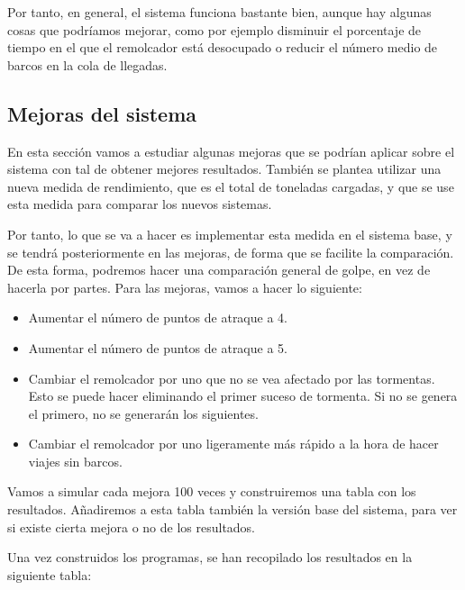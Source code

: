 \documentclass[11pt,a4paper]{article}
\begin{document}
Por tanto, en general, el sistema funciona bastante bien, aunque hay algunas cosas
que podríamos mejorar, como por ejemplo disminuir el porcentaje de tiempo en el que
el remolcador está desocupado o reducir el número medio de barcos en la cola de llegadas.

\subsection{Mejoras del sistema}

En esta sección vamos a estudiar algunas mejoras que se podrían aplicar sobre el
sistema con tal de obtener mejores resultados. También se plantea utilizar una nueva
medida de rendimiento, que es el total de toneladas cargadas, y que se use esta
medida para comparar los nuevos sistemas.

Por tanto, lo que se va a hacer es implementar esta medida en el sistema base, y
se tendrá posteriormente en las mejoras, de forma que se facilite la comparación.
De esta forma, podremos hacer una comparación general de golpe, en vez de hacerla
por partes. Para las mejoras, vamos a hacer lo siguiente:

\begin{itemize}[label=\textbullet]
	\item Aumentar el número de puntos de atraque a 4.
	\item Aumentar el número de puntos de atraque a 5.
	\item Cambiar el remolcador por uno que no se vea afectado por las tormentas.
	Esto se puede hacer eliminando el primer suceso de tormenta. Si no se genera el
	primero, no se generarán los siguientes.
	\item Cambiar el remolcador por uno ligeramente más rápido a la hora de hacer
	viajes sin barcos.
\end{itemize}

Vamos a simular cada mejora 100 veces y construiremos una tabla con los resultados.
Añadiremos a esta tabla también la versión base del sistema, para ver si existe cierta
mejora o no de los resultados.

Una vez construidos los programas, se han recopilado los resultados en la siguiente
tabla:
\end{document}
